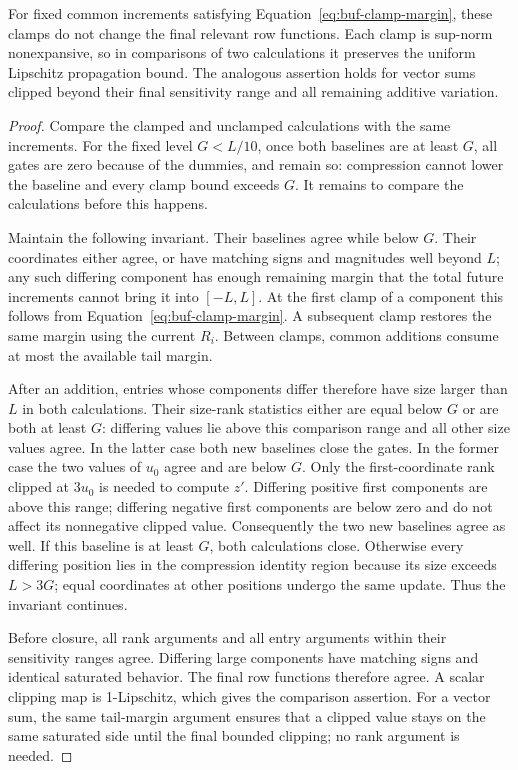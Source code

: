 \begin{lemma}
\label{lem:buf-clamping}
For fixed common increments satisfying
Equation~\eqref{eq:buf-clamp-margin}, these clamps do not change the
final relevant row functions.  Each clamp is sup-norm nonexpansive, so
in comparisons of two calculations it preserves the uniform Lipschitz
propagation bound.  The analogous assertion holds for vector sums clipped
beyond their final sensitivity range and all remaining additive variation.
\end{lemma}
\begin{proof}
Compare the clamped and unclamped calculations with the same increments.
For the fixed level $G<L/10$, once both baselines are at
least $G$, all gates are zero because of the dummies, and remain so:
compression cannot lower the baseline and every clamp bound exceeds $G$.
It remains to compare the calculations before this happens.

Maintain the following invariant.  Their baselines agree while below $G$.
Their coordinates either agree, or have matching signs and magnitudes
well beyond $L$; any such differing component has enough remaining
margin that the total future increments cannot bring it into
$[-L,L]$.  At the first clamp of a component this follows from
Equation~\eqref{eq:buf-clamp-margin}.  A subsequent clamp restores the
same margin using the current $R_i$.  Between clamps, common additions
consume at most the available tail margin.

After an addition, entries whose components differ therefore have size
larger than $L$ in both calculations.  Their size-rank statistics either
are equal below $G$ or are both at least $G$: differing values lie above
this comparison range and all other size values agree.
In the latter case both new baselines close the gates.  In the former
case the two values of $u_0$ agree and are below $G$.
Only the first-coordinate rank clipped at $3u_0$ is needed to compute
$z'$.  Differing positive first components are above this range;
differing negative first components are below zero and do not affect
its nonnegative clipped value.  Consequently the two new baselines
agree as well.  If this baseline is at least $G$, both calculations
close.  Otherwise every differing position lies in the compression
identity region because its size exceeds $L>3G$; equal coordinates at
other positions undergo the same update.  Thus the invariant continues.

Before closure, all rank arguments and all entry arguments within their
sensitivity ranges agree.  Differing large components have matching
signs and identical saturated behavior.  The final row functions
therefore agree.  A scalar clipping map is 1-Lipschitz, which gives the
comparison assertion.  For a vector sum, the same tail-margin argument
ensures that a clipped value stays on the same saturated side until the
final bounded clipping; no rank argument is needed.
\end{proof}

